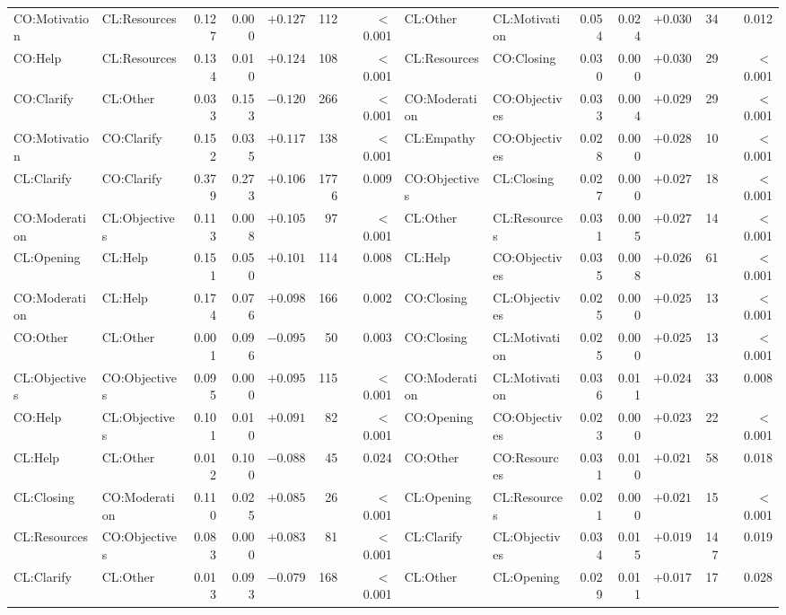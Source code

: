 \begin{tabular}{llrrrrr@{\hspace{1.5em}}llrrrrr}
CO:Motivation & CL:Resources & 0.127 & 0.000 & $+0.127$ & 112 & $<$0.001 & CL:Other & CL:Motivation & 0.054 & 0.024 & $+0.030$ & 34 & 0.012 \\
CO:Help & CL:Resources & 0.134 & 0.010 & $+0.124$ & 108 & $<$0.001 & CL:Resources & CO:Closing & 0.030 & 0.000 & $+0.030$ & 29 & $<$0.001 \\
CO:Clarify & CL:Other & 0.033 & 0.153 & $-0.120$ & 266 & $<$0.001 & CO:Moderation & CO:Objectives & 0.033 & 0.004 & $+0.029$ & 29 & $<$0.001 \\
CO:Motivation & CO:Clarify & 0.152 & 0.035 & $+0.117$ & 138 & $<$0.001 & CL:Empathy & CO:Objectives & 0.028 & 0.000 & $+0.028$ & 10 & $<$0.001 \\
CL:Clarify & CO:Clarify & 0.379 & 0.273 & $+0.106$ & 1776 & 0.009 & CO:Objectives & CL:Closing & 0.027 & 0.000 & $+0.027$ & 18 & $<$0.001 \\
CO:Moderation & CL:Objectives & 0.113 & 0.008 & $+0.105$ & 97 & $<$0.001 & CL:Other & CL:Resources & 0.031 & 0.005 & $+0.027$ & 14 & $<$0.001 \\
CL:Opening & CL:Help & 0.151 & 0.050 & $+0.101$ & 114 & 0.008 & CL:Help & CO:Objectives & 0.035 & 0.008 & $+0.026$ & 61 & $<$0.001 \\
CO:Moderation & CL:Help & 0.174 & 0.076 & $+0.098$ & 166 & 0.002 & CO:Closing & CL:Objectives & 0.025 & 0.000 & $+0.025$ & 13 & $<$0.001 \\
CO:Other & CL:Other & 0.001 & 0.096 & $-0.095$ & 50 & 0.003 & CO:Closing & CL:Motivation & 0.025 & 0.000 & $+0.025$ & 13 & $<$0.001 \\
CL:Objectives & CO:Objectives & 0.095 & 0.000 & $+0.095$ & 115 & $<$0.001 & CO:Moderation & CL:Motivation & 0.036 & 0.011 & $+0.024$ & 33 & 0.008 \\
CO:Help & CL:Objectives & 0.101 & 0.010 & $+0.091$ & 82 & $<$0.001 & CO:Opening & CO:Objectives & 0.023 & 0.000 & $+0.023$ & 22 & $<$0.001 \\
CL:Help & CL:Other & 0.012 & 0.100 & $-0.088$ & 45 & 0.024 & CO:Other & CO:Resources & 0.031 & 0.010 & $+0.021$ & 58 & 0.018 \\
CL:Closing & CO:Moderation & 0.110 & 0.025 & $+0.085$ & 26 & $<$0.001 & CL:Opening & CL:Resources & 0.021 & 0.000 & $+0.021$ & 15 & $<$0.001 \\
CL:Resources & CO:Objectives & 0.083 & 0.000 & $+0.083$ & 81 & $<$0.001 & CL:Clarify & CL:Objectives & 0.034 & 0.015 & $+0.019$ & 147 & 0.019 \\
CL:Clarify & CL:Other & 0.013 & 0.093 & $-0.079$ & 168 & $<$0.001 & CL:Other & CL:Opening & 0.029 & 0.011 & $+0.017$ & 17 & 0.028 \\

\end{tabular}
